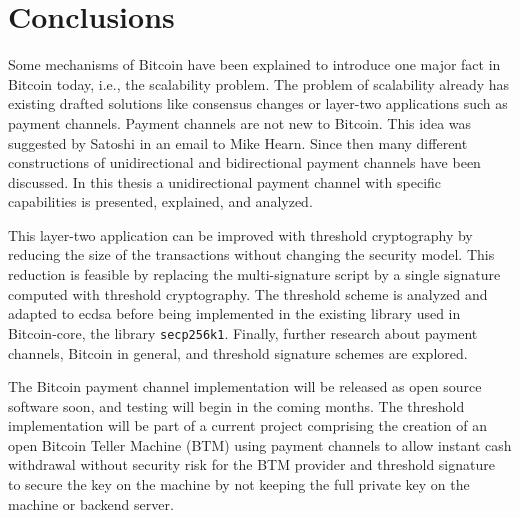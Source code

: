 \chapter{Conclusions}
\label{chap:conclusions}

Some mechanisms of Bitcoin have been explained to introduce one major
fact in Bitcoin today, i.e., the scalability problem. The problem of scalability
already has existing drafted solutions like consensus changes or layer-two
applications such as payment channels. Payment channels are not new to Bitcoin.
This idea was suggested by Satoshi in an email to Mike Hearn. Since then many
different constructions of unidirectional and bidirectional payment channels
have been discussed. In this thesis a unidirectional payment channel with
specific capabilities is presented, explained, and analyzed.

This layer-two application can be improved with threshold cryptography by
reducing the size of the transactions without changing the security model. This
reduction is feasible by replacing the multi-signature script by a single
signature computed with threshold cryptography. The threshold scheme is analyzed
and adapted to \gls{ecdsa} before being implemented in the existing library used
in Bitcoin-core, the library \texttt{secp256k1}. Finally, further research about
payment channels, Bitcoin in general, and threshold signature schemes are
explored.

The Bitcoin payment channel implementation will be released as open source
software soon, and testing will begin in the coming months. The threshold
implementation will be part of a current project comprising the creation of an
open Bitcoin Teller Machine (BTM) using payment channels to allow instant
cash withdrawal without security risk for the BTM provider and threshold signature
to secure the key on the machine by not keeping the full private key on the machine or backend server.
